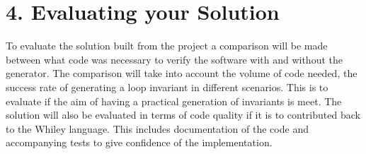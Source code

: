 \documentclass[11pt, a4paper, twoside, openright]{report}
\begin{document}
%
%
%
%

\section*{4. Evaluating your Solution}



To evaluate the solution built from the project a comparison will
be made between what code was necessary to verify the software with and without
the generator.
The comparison will take into account the volume of code needed, the
success rate of generating a loop invariant in different scenarios.
This is to evaluate if the aim of having a practical generation of invariants
is meet.
The solution will also be evaluated in terms of code quality if it is
to contributed back to the Whiley language. This includes documentation
of the code and accompanying tests to give confidence of the implementation.
\end{document}
